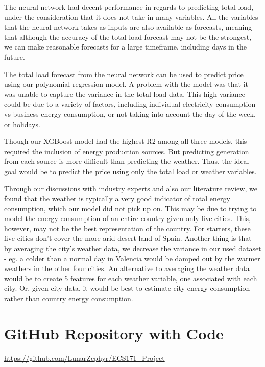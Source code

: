 \documentclass[10pt]{article}
\begin{document}
The neural network had decent performance in regards to predicting total load, under the consideration that it does not take in many variables. All the variables that the neural network takes as inputs are also available as forecasts, meaning that although the accuracy of the total load forecast may not be the strongest, we can make reasonable forecasts for a large timeframe, including days in the future.

The total load forecast from the neural network can be used to predict price using our polynomial regression model. A problem with the model was that it was unable to capture the variance in the total load data. This high variance could be due to a variety of factors, including individual electricity consumption vs business energy consumption, or not taking into account the day of the week, or holidays. 

Though our XGBoost model had the highest R2 among all three models, this required the inclusion of energy production sources. But predicting generation from each source is more difficult than predicting the weather. Thus, the ideal goal would be to predict the price using only the total load or weather variables. 

Through our discussions with industry experts and also our literature review, we found that the weather is typically a very good indicator of total energy consumption, which our model did not pick up on. This may be due to trying to model the energy consumption of an entire country given only five cities. This, however, may not be the best representation of the country. For starters, these five cities don’t cover the more arid desert land of Spain. Another thing is that by averaging the city’s weather data, we decrease the variance in our used dataset - eg. a colder than a normal day in Valencia would be damped out by the warmer weathers in the other four cities. An alternative to averaging the weather data would be to create 5 features for each weather variable, one associated with each city. Or, given city data, it would be best to estimate city energy consumption rather than country energy consumption. 

\section{GitHub Repository with Code}

\url{https://github.com/LunarZephyr/ECS171_Project}
\end{document}
